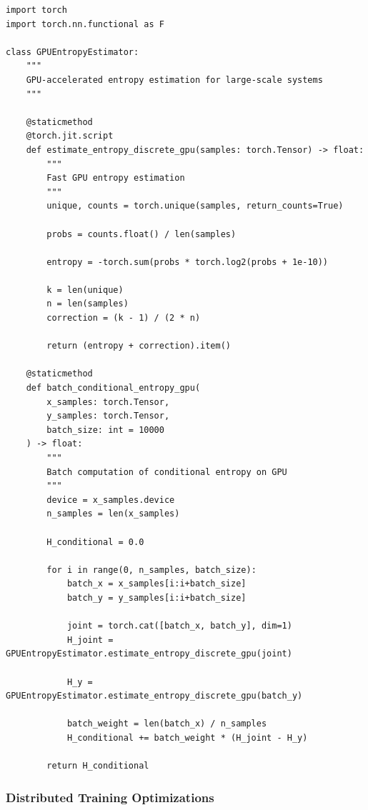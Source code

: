 \documentclass[10pt, letterpaper]{article}
\begin{document}
\begin{lstlisting}
import torch
import torch.nn.functional as F

class GPUEntropyEstimator:
    """
    GPU-accelerated entropy estimation for large-scale systems
    """

    @staticmethod
    @torch.jit.script
    def estimate_entropy_discrete_gpu(samples: torch.Tensor) -> float:
        """
        Fast GPU entropy estimation
        """
        unique, counts = torch.unique(samples, return_counts=True)

        probs = counts.float() / len(samples)

        entropy = -torch.sum(probs * torch.log2(probs + 1e-10))

        k = len(unique)
        n = len(samples)
        correction = (k - 1) / (2 * n)

        return (entropy + correction).item()

    @staticmethod
    def batch_conditional_entropy_gpu(
        x_samples: torch.Tensor,
        y_samples: torch.Tensor,
        batch_size: int = 10000
    ) -> float:
        """
        Batch computation of conditional entropy on GPU
        """
        device = x_samples.device
        n_samples = len(x_samples)

        H_conditional = 0.0

        for i in range(0, n_samples, batch_size):
            batch_x = x_samples[i:i+batch_size]
            batch_y = y_samples[i:i+batch_size]

            joint = torch.cat([batch_x, batch_y], dim=1)
            H_joint = GPUEntropyEstimator.estimate_entropy_discrete_gpu(joint)

            H_y = GPUEntropyEstimator.estimate_entropy_discrete_gpu(batch_y)

            batch_weight = len(batch_x) / n_samples
            H_conditional += batch_weight * (H_joint - H_y)

        return H_conditional
\end{lstlisting}

\subsubsection{Distributed Training Optimizations}
\end{document}
